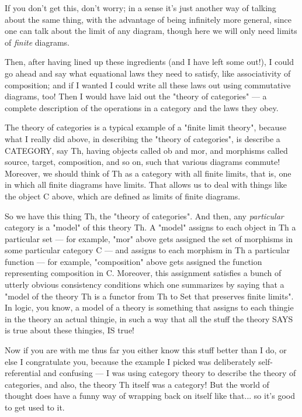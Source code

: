 If you don't get this, don't worry; in a sense it's just another way 
of talking about the same thing, with the advantage of being 
infinitely more general, since one can talk about the limit of 
any diagram, though here we will only need limits of \emph{finite}
diagrams.

Then, after having lined up these ingredients (and I have left some 
out!), I could go ahead and say what equational laws they need 
to satisfy, like associativity of composition; and if I wanted I 
could write all these laws out using commutative diagrams, too!  
Then I would have laid out the "theory of categories" --- 
a complete description of the operations in a category and the laws they obey.  

The theory of categories is a typical example of a "finite limit 
theory", because what I really did above, in describing
the "theory of categories", is describe a CATEGORY, say Th, having
objects called ob and mor, and morphisms called source, target, composition,
and so on, such that various diagrams commute!   Moreover, we should
think of Th as a category with all finite limits, that is, one in which
all finite diagrams have limits.  That allows us to deal with things
like the object C above, which are defined as limits of finite
diagrams.

So we have this thing Th, the "theory of categories".  And then, 
any \emph{particular} category is a "model" of this theory Th.
A "model" assigns to each object in Th a particular
set --- for example, "mor" above gets assigned
the set of morphisms in some particular category C --- and assigns to each
morphism in Th a particular function --- for example,  
"composition" above gets assigned the function representing composition
in C.  Moreover, this assignment satisfies a bunch of utterly obvious 
consistency conditions which one summarizes by saying that a 
"model of the theory Th is a functor from Th to Set that preserves 
finite limits".  In logic, you know, a model of a theory is something 
that assigns to each thingie in the theory an actual thingie, in such a 
way that all the stuff the theory SAYS is true about these thingies, 
IS true!

Now if you are with me thus far you either know this stuff better
than I do, or else I congratulate you, because the example I 
picked was deliberately self-referential and confusing --- I was
using category theory to describe the theory of categories, and also,
the theory Th itself was a category!  But the world of thought does have
a funny way of wrapping back on itself like that... so it's good
to get used to it.

